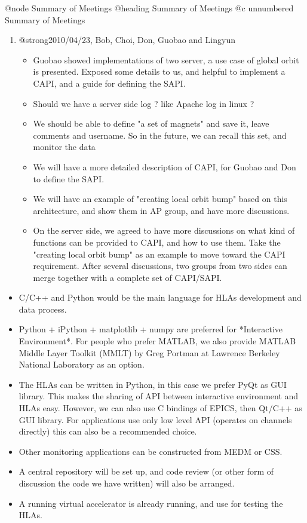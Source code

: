 \documentclass[letterpaper,showtrims]{memoir}
\begin{document}
@node Summary of Meetings
@heading Summary of Meetings
@c unnumbered Summary of Meetings

\begin{enumerate}
\item @strong{2010/04/23, Bob, Choi, Don, Guobao and Lingyun}
      \begin{itemize}%
      \item Guobao showed implementations of two server, a use case of global
     orbit is presented. Exposed some details to us, and helpful to
     implement a CAPI, and a guide for defining the SAPI.
     \item Should we have a server side log ? like Apache log in linux ?
   \item We should be able to define "a set of magnets" and save it, leave
     comments and username. So in the future, we can recall this set, and monitor the data
   \item We will have a more detailed description of CAPI, for Guobao and Don
     to define the SAPI.
   \item We will have an example of "creating local orbit bump" based on this
     architecture, and show them in AP group, and have more discussions.
   \item On the server side, we agreed to have more discussions on what kind of functions can be provided to CAPI, and how to use them. Take the "creating local orbit bump" as an example to move toward the CAPI requirement. After several discussions, two groups from two sides can merge together with a complete set of CAPI/SAPI.
   \end{itemize}
\end{enumerate}


\begin{itemize}
\item C/C++ and Python would be the main language for HLAs development and data process.
\item Python + iPython + matplotlib + numpy are preferred for
   *Interactive Environment*. For people who prefer MATLAB, we also provide MATLAB Middle Layer Toolkit (MMLT) by Greg Portman at Lawrence Berkeley National Laboratory as an option.
\item The HLAs can be written in Python, in this case we prefer PyQt as GUI
   library. This makes the sharing of API between interactive environment
   and HLAs easy. However, we can also use C bindings of EPICS, then
   Qt/C++ as GUI library. For applications use only low level API
   (operates on channels directly) this can also be a recommended choice.
 \item Other monitoring applications can be constructed from MEDM or CSS.
 \item A central repository will be set up, and code review (or other form of
   discussion the code we have written) will also be arranged.
 \item A running virtual accelerator is already running, and use for testing
   the HLAs.
\end{itemize}
\end{document}
